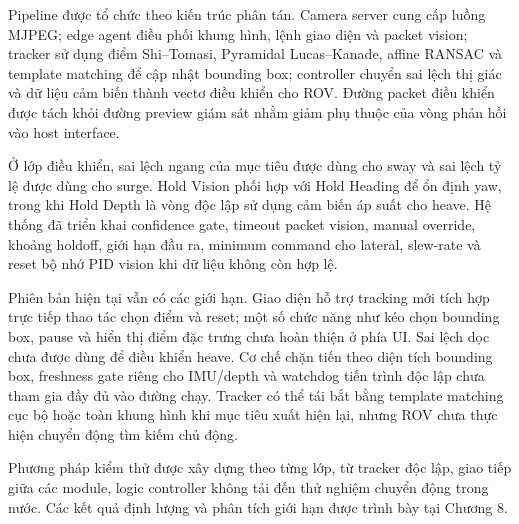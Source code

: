 \documentclass[../DoAn.tex]{subfiles}
\begin{document}
Pipeline được tổ chức theo kiến trúc phân tán. Camera server cung cấp luồng MJPEG; edge agent điều phối khung hình, lệnh giao diện và packet vision; tracker sử dụng điểm Shi--Tomasi, Pyramidal Lucas--Kanade, affine RANSAC và template matching để cập nhật bounding box; controller chuyển sai lệch thị giác và dữ liệu cảm biến thành vectơ điều khiển cho ROV. Đường packet điều khiển được tách khỏi đường preview giám sát nhằm giảm phụ thuộc của vòng phản hồi vào host interface.

Ở lớp điều khiển, sai lệch ngang của mục tiêu được dùng cho sway và sai lệch tỷ lệ được dùng cho surge. Hold Vision phối hợp với Hold Heading để ổn định yaw, trong khi Hold Depth là vòng độc lập sử dụng cảm biến áp suất cho heave. Hệ thống đã triển khai confidence gate, timeout packet vision, manual override, khoảng holdoff, giới hạn đầu ra, minimum command cho lateral, slew-rate và reset bộ nhớ PID vision khi dữ liệu không còn hợp lệ.

Phiên bản hiện tại vẫn có các giới hạn. Giao diện hỗ trợ tracking mới tích hợp trực tiếp thao tác chọn điểm và reset; một số chức năng như kéo chọn bounding box, pause và hiển thị điểm đặc trưng chưa hoàn thiện ở phía UI. Sai lệch dọc chưa được dùng để điều khiển heave. Cơ chế chặn tiến theo diện tích bounding box, freshness gate riêng cho IMU/depth và watchdog tiến trình độc lập chưa tham gia đầy đủ vào đường chạy. Tracker có thể tái bắt bằng template matching cục bộ hoặc toàn khung hình khi mục tiêu xuất hiện lại, nhưng ROV chưa thực hiện chuyển động tìm kiếm chủ động.

Phương pháp kiểm thử được xây dựng theo từng lớp, từ tracker độc lập, giao tiếp giữa các module, logic controller không tải đến thử nghiệm chuyển động trong nước. Các kết quả định lượng và phân tích giới hạn được trình bày tại Chương 8.
\end{document}
